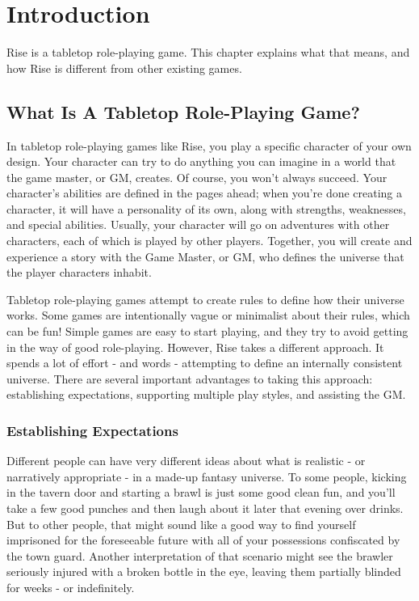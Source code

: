 \chapter{Introduction}

Rise is a tabletop role-playing game.
This chapter explains what that means, and how Rise is different from other existing games.

\section{What Is A Tabletop Role-Playing Game?}
    In tabletop role-playing games like Rise, you play a specific character of your own design.
    Your character can try to do anything you can imagine in a world that the game master, or GM, creates.
    Of course, you won't always succeed.
    Your character's abilities are defined in the pages ahead; when you're done creating a character, it will have a personality of its own, along with strengths, weaknesses, and special abilities.
    Usually, your character will go on adventures with other characters, each of which is played by other players.
    Together, you will create and experience a story with the Game Master, or GM, who defines the universe that the player characters inhabit.

    Tabletop role-playing games attempt to create rules to define how their universe works.
    Some games are intentionally vague or minimalist about their rules, which can be fun!
    Simple games are easy to start playing, and they try to avoid getting in the way of good role-playing.
    However, Rise takes a different approach.
    It spends a lot of effort - and words - attempting to define an internally consistent universe.
    There are several important advantages to taking this approach: establishing expectations, supporting multiple play styles, and assisting the GM.

    \subsection{Establishing Expectations}
        Different people can have very different ideas about what is realistic - or narratively appropriate - in a made-up fantasy universe.
        To some people, kicking in the tavern door and starting a brawl is just some good clean fun, and you'll take a few good punches and then laugh about it later that evening over drinks.
        But to other people, that might sound like a good way to find yourself imprisoned for the foreseeable future with all of your possessions confiscated by the town guard.
        Another interpretation of that scenario might see the brawler seriously injured with a broken bottle in the eye, leaving them partially blinded for weeks - or indefinitely.

